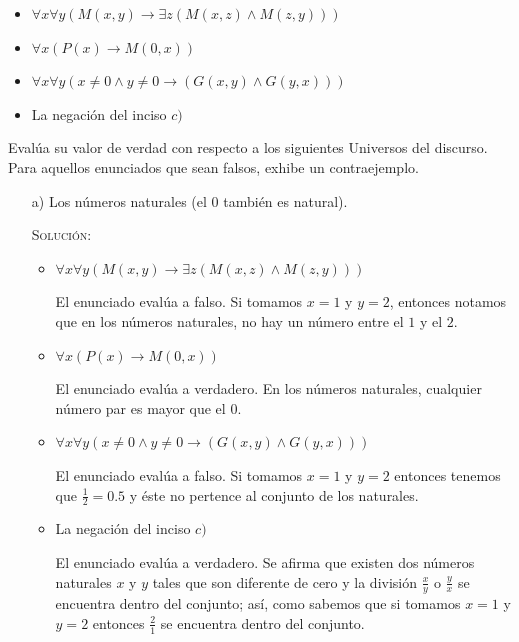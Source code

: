 \documentclass[letterpaper,11pt]{article}
\begin{document}
\begin{enumerate}
    \begin{itemize}
        \item $∀x ∀y (M(x, y) → ∃z(M(x, z) \land M(z, y)))$
        \item $∀x (P(x) → M(0, x))$
        \item $∀x ∀y (x \neq 0 \land y \neq 0 → (G(x, y) \land G(y, x)))$
        \item La negación del inciso $c)$         
    \end{itemize}

    \newpage
    Evalúa su valor de verdad con respecto a los siguientes Universos del 
    discurso. Para aquellos enunciados que sean falsos, exhibe un 
    contraejemplo.

    \begin{itemize}
        \item[a)] Los números naturales (el $0$ también es natural).

        \textsc{Solución:}
        \begin{itemize}
            \item $∀x ∀y (M(x, y) → ∃z(M(x, z) \land M(z, y)))$

            El enunciado evalúa a falso. Si tomamos $x = 1$ y $y = 2$, entonces 
            notamos que en los números naturales, no hay un número entre el $1$
            y el $2$. 

            \item $∀x (P(x) → M(0, x))$

            El enunciado evalúa a verdadero. En los números naturales, 
            cualquier número par es mayor que el $0$.

            \item $∀x ∀y (x \neq 0 \land y \neq 0 → (G(x, y) \land G(y, x)))$

            El enunciado evalúa a falso. Si tomamos $x = 1$ y $y = 2$ entonces 
            tenemos que $\frac{1}{2} = 0.5$ y éste no pertence al conjunto de 
            los naturales. 

            \item La negación del inciso $c)$
            
            El enunciado evalúa a verdadero. Se afirma que existen dos números 
            naturales $x$ y $y$ tales que son diferente de cero y la división
            $\frac{x}{y}$ o $\frac{y}{x}$ se encuentra dentro del conjunto;
            así, como sabemos que si tomamos $x = 1$ y $y = 2$ entonces 
            $\frac{2}{1}$ se encuentra dentro del conjunto. 
        \end{itemize}


\end{itemize}
\end{enumerate}
\end{document}
